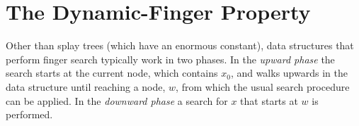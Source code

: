\documentclass{patmorin}
\begin{document}
%
%
%
%
%
%
%
%


\section{The Dynamic-Finger Property}

Other than splay trees (which have an enormous constant), data
structures that perform finger search typically work in two phases.
In the \emph{upward phase} the search starts at the current node, which
contains $x_0$, and walks upwards in the data structure until reaching a
node, $w$, from which the usual search procedure can be applied.  In the
\emph{downward phase} a search for $x$ that starts at $w$ is performed.
\end{document}
